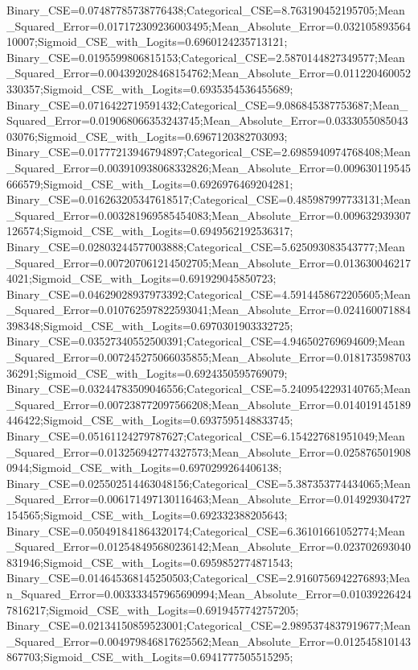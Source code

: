 Binary_CSE=0.07487785738776438;Categorical_CSE=8.763190452195705;Mean_Squared_Error=0.017172309236003495;Mean_Absolute_Error=0.03210589356410007;Sigmoid_CSE_with_Logits=0.6960124235713121;
Binary_CSE=0.0195599806815153;Categorical_CSE=2.5870144827349577;Mean_Squared_Error=0.004392028468154762;Mean_Absolute_Error=0.011220460052330357;Sigmoid_CSE_with_Logits=0.6935354536455689;
Binary_CSE=0.0716422719591432;Categorical_CSE=9.086845387753687;Mean_Squared_Error=0.019068066353243745;Mean_Absolute_Error=0.033305508504303076;Sigmoid_CSE_with_Logits=0.6967120382703093;
Binary_CSE=0.01777213946794897;Categorical_CSE=2.6985940974768408;Mean_Squared_Error=0.003910938068332826;Mean_Absolute_Error=0.009630119545666579;Sigmoid_CSE_with_Logits=0.6926976469204281;
Binary_CSE=0.016263205347618517;Categorical_CSE=0.485987997733131;Mean_Squared_Error=0.003281969585454083;Mean_Absolute_Error=0.009632939307126574;Sigmoid_CSE_with_Logits=0.6949562192536317;
Binary_CSE=0.02803244577003888;Categorical_CSE=5.625093083543777;Mean_Squared_Error=0.007207061214502705;Mean_Absolute_Error=0.0136300462174021;Sigmoid_CSE_with_Logits=0.691929045850723;
Binary_CSE=0.04629028937973392;Categorical_CSE=4.5914458672205605;Mean_Squared_Error=0.010762597822593041;Mean_Absolute_Error=0.024160071884398348;Sigmoid_CSE_with_Logits=0.6970301903332725;
Binary_CSE=0.03527340552500391;Categorical_CSE=4.946502769694609;Mean_Squared_Error=0.007245275066035855;Mean_Absolute_Error=0.01817359870336291;Sigmoid_CSE_with_Logits=0.6924350595769079;
Binary_CSE=0.03244783509046556;Categorical_CSE=5.2409542293140765;Mean_Squared_Error=0.007238772097566208;Mean_Absolute_Error=0.014019145189446422;Sigmoid_CSE_with_Logits=0.6937595148833745;
Binary_CSE=0.05161124279787627;Categorical_CSE=6.154227681951049;Mean_Squared_Error=0.013256942774327573;Mean_Absolute_Error=0.0258765019080944;Sigmoid_CSE_with_Logits=0.6970299264406138;
Binary_CSE=0.025502514463048156;Categorical_CSE=5.387353774434065;Mean_Squared_Error=0.006171497130116463;Mean_Absolute_Error=0.014929304727154565;Sigmoid_CSE_with_Logits=0.692332388205643;
Binary_CSE=0.050491841864320174;Categorical_CSE=6.36101661052774;Mean_Squared_Error=0.012548495680236142;Mean_Absolute_Error=0.023702693040831946;Sigmoid_CSE_with_Logits=0.6959852774871543;
Binary_CSE=0.014645368145250503;Categorical_CSE=2.9160756942276893;Mean_Squared_Error=0.003333457965690994;Mean_Absolute_Error=0.010392264247816217;Sigmoid_CSE_with_Logits=0.6919457742757205;
Binary_CSE=0.02134150859523001;Categorical_CSE=2.9895374837919677;Mean_Squared_Error=0.004979846817625562;Mean_Absolute_Error=0.012545810143867703;Sigmoid_CSE_with_Logits=0.6941777505515295;
